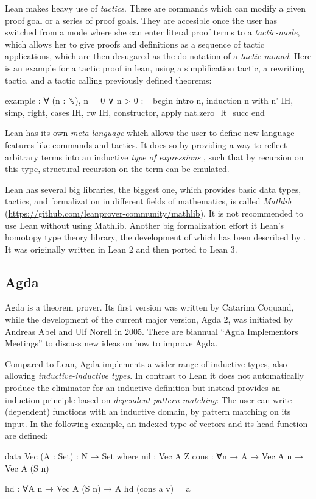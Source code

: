 Lean makes heavy use of \emph{tactics}.
These are commands which can modify a given proof goal or a series of proof
goals.
They are accesible once the user has switched from a mode where she can
enter literal proof terms to a \emph{tactic-mode},
which allows her to give proofs and definitions as a sequence of tactic applications,
which are then desugared as the do-notation of a \emph{tactic monad}.
Here is an example for a tactic proof in lean, using a simplification tactic,
a rewriting tactic, and a tactic calling previously defined theorems:
\begin{leancodebr}
example : ∀ (n : ℕ), n = 0 ∨ n > 0 :=
begin
  intro n,
  induction n with n' IH,
  simp,
  right,
  cases IH,
  rw IH, constructor,
  apply nat.zero_lt_succ
end
\end{leancodebr}

Lean has its own \emph{meta-language} which allows the user to define new
language features like commands and tactics.
It does so by providing a way to reflect arbitrary terms into an inductive \emph{type of
expressions} ,
such that by recursion on this type, structural recursion on the term can 
be emulated.

Lean has several big libraries, the biggest one, which provides basic data types,
tactics, and formalization in different fields of mathematics, is called
\emph{Mathlib} (\url{https://github.com/leanprover-community/mathlib}).
It is not recommended to use Lean without using Mathlib.
Another big formalization effort it Lean's homotopy type theory library,
the development of which has been described by \citet{leanhott}.
It was originally written in Lean 2 and then ported to Lean 3.

\subsection{Agda}

Agda is a theorem prover. Its first version was written by Catarina Coquand, while
the development of the current major version, Agda 2, was initiated by
Andreas Abel and Ulf Norell in 2005.
There are biannual ``Agda Implementors Meetings'' to discuss new ideas on how to
improve Agda.

Compared to Lean, Agda implements a wider range of inductive types,
also allowing \emph{inductive-inductive types}.
In contrast to Lean it does not automatically produce the eliminator for an
inductive definition but instead provides an induction principle based
on \emph{dependent pattern matching}:
The user can write (dependent) functions with an inductive domain, by pattern
matching on its input.
In the following example, an indexed type of vectors and its head function are
defined:
\begin{agdacode}
data Vec (A : Set) : N → Set where
  nil : Vec A Z
  cons : ∀{n} → A → Vec A n → Vec A (S n)

hd : ∀{A n} → Vec A (S n) → A
hd (cons a v) = a
\end{agdacode}


